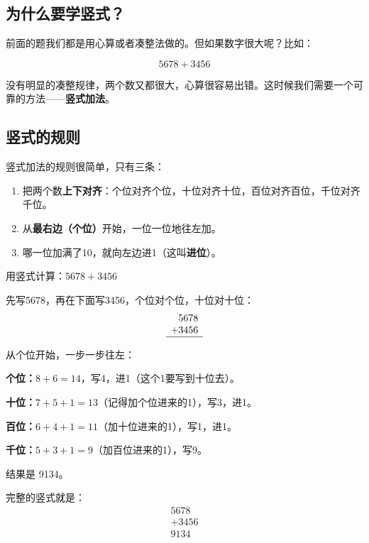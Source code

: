 \subsection*{为什么要学竖式？}

前面的题我们都是用心算或者凑整法做的。但如果数字很大呢？比如：

\[
5678 + 3456
\]

没有明显的凑整规律，两个数又都很大，心算很容易出错。这时候我们需要一个可靠的方法——\textbf{竖式加法}。

\subsection*{竖式的规则}

竖式加法的规则很简单，只有三条：

\begin{enumerate}
  \item 把两个数\textbf{上下对齐}：个位对齐个位，十位对齐十位，百位对齐百位，千位对齐千位。
  \item 从\textbf{最右边（个位）}开始，一位一位地往左加。
  \item 哪一位加满了10，就向左边进1（这叫\textbf{进位}）。
\end{enumerate}

\begin{example}
用竖式计算：$5678+3456$
\end{example}
\begin{solution}
先写5678，再在下面写3456，个位对个位，十位对十位：
\[
\begin{array}{r}
  5678 \\
+ 3456 \\ \hline
\end{array}
\]

从个位开始，一步一步往左：

\textbf{个位：}$8+6=14$，写4，进1（这个1要写到十位去）。

\textbf{十位：}$7+5+1=13$（记得加个位进来的1），写3，进1。

\textbf{百位：}$6+4+1=11$（加十位进来的1），写1，进1。

\textbf{千位：}$5+3+1=9$（加百位进来的1），写9。

结果是 9134。

完整的竖式就是：
\[
\begin{array}{r}
  5678 \\
+ 3456 \\ \hline
  9134
\end{array}
\]
\end{solution}

